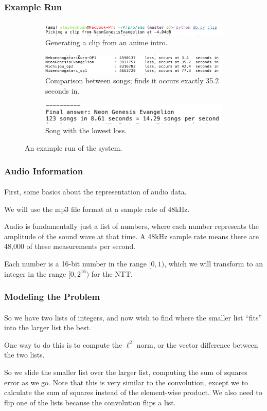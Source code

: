 \documentclass{beamer}                             %
\begin{document}
\begin{frame}
\frametitle{Example Run}
\framesubtitle{}
\begin{figure}[h!]
    \begin{subfigure}[h]{0.8 \textwidth}
      \includegraphics[scale=0.5]{clip.png}
      \caption{Generating a clip from an anime intro.}
    \end{subfigure}
    
    \begin{subfigure}[h]{0.4 \textwidth}
      \includegraphics[scale=0.3]{compare.png}
      \caption{Comparison between songs; finds it occurs exactly 35.2 seconds in.}
    \end{subfigure}
    \hfill
    \begin{subfigure}[h]{0.4 \textwidth}
      \includegraphics[scale=0.3]{result.png}
      \caption{Song with the lowest loss.}
    \end{subfigure}
    \caption{An example run of the system.}
\end{figure}
\end{frame}

\begin{frame}
\frametitle{Audio Information}
\framesubtitle{}
First, some basics about the representation of audio data. \pause

We will use the mp3 file format at a sample rate of 48kHz. \pause 

Audio is fundamentally just a list of numbers, where each number represents
the amplitude of the sound wave at that time. A 48kHz sample rate means 
there are 48,000 of these measurements per second. \pause

Each number is a 16-bit number in the range \( [0, 1) \), which we
will transform to an integer in the range \( [0, 2^{16}) \) for the NTT.
\end{frame}

\begin{frame}
\frametitle{Modeling the Problem}
\framesubtitle{}
So we have two lists of integers, and now wish to find where the smaller list
\enquote{fits} into the larger list the best. \pause

One way to do this is to compute the \alert{\( \ell^2 \) norm},
or the vector difference between the two lists. \pause

So we slide the smaller list over the larger list, computing the sum of squares
error as we go. Note that this is very similar to the convolution, except
we to calculate the sum of squares instead of the element-wise product.
We also need to flip one of the lists because the convolution flips a list.
\end{frame}
\end{document}
